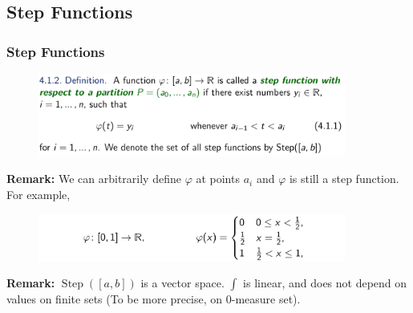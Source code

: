 \documentclass[10pt, t]{beamer}
\begin{document}
\subsection{Step Functions}
\begin{frame}
    \frametitle{Step Functions}
    \begin{figure}[H]
        \centering
        \includegraphics[width=0.9\textwidth]{2020-12-05-11-51-42.png}
    \end{figure}
    \textbf{Remark:} We can arbitrarily define $\varphi$ at points $a_i$ and $\varphi$ is still a step function. For example, 
    \begin{figure}[H]
        \centering
        \includegraphics[width=0.9\textwidth]{2020-12-05-11-54-33.png}
    \end{figure}
    \textbf{Remark:} $\operatorname{Step}([a,b])$ is a vector space. $\int$ is linear, and does not depend on values on finite sets (To be more precise, on 0-measure set).
\end{frame}
\end{document}
